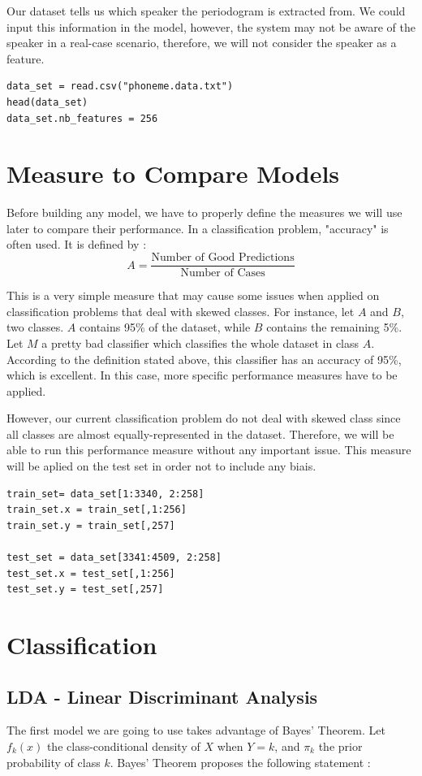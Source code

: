 \documentclass[]{report}
\begin{document}
Our dataset tells us which speaker the periodogram is extracted from. We could input this information in the model, however, the system may not be aware of the speaker in a real-case scenario, therefore, we will not consider the speaker as a feature. 

\begin{lstlisting}
data_set = read.csv("phoneme.data.txt")
head(data_set)
data_set.nb_features = 256
\end{lstlisting}

\section{Measure to Compare Models}
Before building any model, we have to properly define the measures we will use later to compare their performance. In a classification problem, "accuracy" is often used. It is defined by :
$$
	A = \frac{\text{Number of Good Predictions}}{\text{Number of Cases}}
$$

This is a very simple measure that may cause some issues when applied on classification problems that deal with skewed classes. For instance, let $A$ and $B$, two classes. $A$ contains 95\% of the dataset, while $B$ contains the remaining 5\%. Let $M$ a pretty bad classifier which classifies the whole dataset in class $A$. According to the definition stated above, this classifier has an accuracy of 95\%, which is excellent. In this case, more specific performance measures have to be applied.

However, our current classification problem do not deal with skewed class since all classes are almost equally-represented in the dataset. Therefore, we will be able to run this performance measure without any important issue. This measure will be aplied on the test set in order not to include any biais.

\begin{lstlisting}
train_set= data_set[1:3340, 2:258]
train_set.x = train_set[,1:256]
train_set.y = train_set[,257]

test_set = data_set[3341:4509, 2:258]
test_set.x = test_set[,1:256]
test_set.y = test_set[,257]
\end{lstlisting}

\section{Classification}

\subsection{LDA - Linear Discriminant Analysis}
The first model we are going to use takes advantage of Bayes' Theorem. Let $f_k(x)$ the class-conditional density of $X$ when $Y=k$, and $\pi_k$ the prior probability of class $k$. Bayes' Theorem proposes the following statement : 
\end{document}
